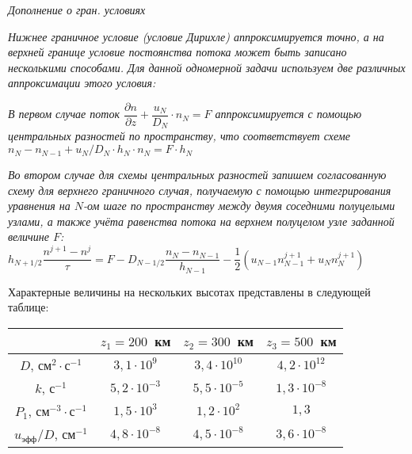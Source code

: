 \documentclass[2pt, a4paper, fleqn]{extarticle}
\begin{document}
\textit{ Дополнение о гран. условиях}

\textit{ Нижнее граничное условие (условие Дирихле) аппроксимируется точно, а на верхней границе условие постоянства потока может быть записано несколькими способами. Для данной одномерной задачи используем две различных аппроксимации этого условия:}


\textit{В первом случае поток $\dfrac{\partial n}{\partial z}+\dfrac{u_N}{D_N}\cdot n_N=F$ аппроксимируется с помощью центральных разностей по пространству, что соответствует схеме $n_N-n_{N-1}+u_N/D_N\cdot h_N\cdot n_N = F\cdot h_N$}

\textit{Во втором случае для схемы центральных разностей запишем согласованную схему для верхнего граничного случая, получаемую с помощью интегрирования уравнения на $N$-ом шаге по пространству между двумя соседними полуцелыми узлами, а также учёта равенства потока на верхнем полуцелом узле заданной величине $F$: $h_{N+1/2}\dfrac{n^{j+1}-n^j}{\tau}= F - D_{N-1/2}\dfrac{n_N-n_{N-1}}{h_{N-1}}-\dfrac{1}{2}(u_{N-1}n_{N-1}^{j+1}+u_{N}n_{N}^{j+1})$
}
 
 Характерные величины на нескольких высотах представлены в следующей таблице: 

\smallskip

\begin{tabular}{|c|c|c|c|}
\hline
&$z_1=200$~км&$z_2=300$~км&$z_3=500$~км\\
\hline
$D$, см$^{2}\cdot$с$^{-1}$&$3{,}1\cdot 10^9$&$3{,}4\cdot 10^{10}$&$4{,}2\cdot 10^{12}$\\
\hline
$k$, с$^{-1}$&$5{,}2\cdot 10^{-3}$&$5{,}5\cdot 10^{-5}$&$1{,}3\cdot 10^{-8}$\\
\hline
$P_1$, см$^{-3}\cdot$с$^{-1}$&$1{,}5\cdot 10^3$&$1{,}2\cdot 10^{2}$&$1{,}3$\\
\hline
$u_\textrm{эфф}/D$, см$^{-1}$&$4{,}8\cdot 10^{-8}$&$4{,}5\cdot 10^{-8}$&$3{,}6\cdot 10^{-8}$\\
\hline
\end{tabular}

\medskip
\end{document}
